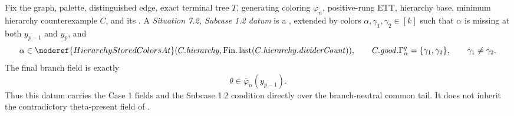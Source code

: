 \begin{definition}
Fix the graph, palette, distinguished edge, exact terminal tree \(T\),
generating coloring \(\varphi_n\), positive-rung ETT, hierarchy base,
minimum hierarchy counterexample \(C\), and its
.  A
\emph{Situation 7.2, Subcase 1.2 datum} is a
, extended by colors
\(\alpha,\gamma_1,\gamma_2\in[k]\) such that \(\alpha\) is missing at
both \(y_{p-1}\) and \(y_p\), and
\[
 \alpha\in
 \noderef{HierarchyStoredColorsAt}
   (C.\mathit{hierarchy},\operatorname{Fin.last}
      (C.\mathit{hierarchy}.\mathit{dividerCount})),
 \qquad
 C.\mathit{good}.\Gamma^q_\alpha=\{\gamma_1,\gamma_2\},
 \qquad \gamma_1\ne\gamma_2.
\]
The final branch field is exactly
\[
                 \theta\in\overline\varphi_n(y_{p-1}).
\]
Thus this datum carries the Case 1 fields and the Subcase 1.2 condition
directly over the branch-neutral common tail.  It does not inherit the
contradictory theta-present field of
.
\end{definition}

